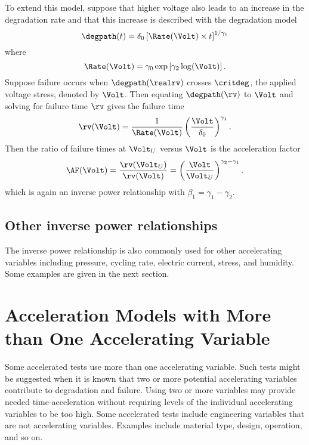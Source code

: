 To extend this model, suppose that higher voltage also leads to an
increase in the degradation rate and that this increase is 
described with the degradation model
\begin{displaymath}
\degpath(t) = \delta_{0} \left [\Rate(\Volt) \times t \right ]^
{1/\gamma_{1}}
\end{displaymath}
where
\begin{displaymath}
\Rate(\Volt)= \gamma_{0} \exp\left[\gamma_{2} \log(\Volt) \right].
\end{displaymath}
Suppose failure occurs when $\degpath(\realrv)$ crosses $\critdeg$, the
applied voltage stress, denoted by $\Volt$. Then equating
$\degpath(\rv)$ to $\Volt$ and solving for failure time $\rv$ gives
the failure time
\begin{displaymath}
{\rv}(\Volt) =\frac{1}{\Rate(\Volt)} 
	\left ( \frac{\Volt}{\delta_{0}} \right)^{\gamma_{1}}.
\end{displaymath}
Then the ratio of failure times at $\Volt_{U}$ versus $\Volt$ 
is the acceleration factor
\begin{displaymath}
\AF(\Volt) = 
\frac{\rv(\Volt_{U})}
     {\rv(\Volt)}=\left ( \frac{ \Volt}{ \Volt_{U} } \right) ^
{\gamma_{2}-\gamma_{1}}.
\end{displaymath}
which is again an inverse power relationship 
with $\beta_{1}=\gamma_{1}-\gamma_{2}$.

\subsection{Other inverse power relationships}
The inverse power relationship is also commonly used for
other accelerating variables including pressure,
cycling rate, electric current, stress, and humidity.
Some examples are given in the next section.

\section{Acceleration Models with More than One Accelerating Variable}
\label{section:multi.factor.at.models}
Some accelerated tests use more than one accelerating variable.  Such
tests might be suggested when it is known that two or more potential
accelerating variables contribute to degradation and failure.
Using two or more variables may provide needed time-acceleration without
requiring levels of the individual accelerating variables to be too
high. Some accelerated tests include engineering variables that are not
accelerating variables. Examples include material type, design, operation,
and so on.

